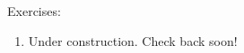 \documentclass[../revisedmain.tex]{subfiles}
\begin{document}
	\begin{center}
		\LARGE Exercises:
	\end{center}
	\begin{enumerate}
		\item Under construction. Check back soon!
	\end{enumerate}
\end{document}

